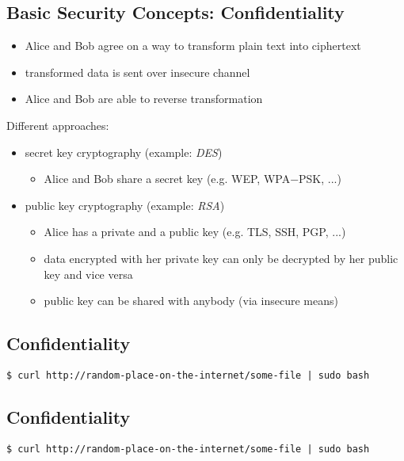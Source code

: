 \documentclass[xga]{xdvislides}
\begin{document}
\subsection{Basic Security Concepts: Confidentiality}
\begin{itemize}
	\item Alice and Bob agree on a way to transform plain text into ciphertext
	\item transformed data is sent over insecure channel
	\item Alice and Bob are able to reverse transformation
\end{itemize}
\addvspace{.5in}
Different approaches:
\begin{itemize}
	\item secret key cryptography (example: {\em DES})
		\begin{itemize}
			\item Alice and Bob share a secret key (e.g. WEP, WPA−PSK, ...)
		\end{itemize}
\end{itemize}
\addvspace{.25in}
\begin{itemize}
	\item public key cryptography (example: {\em RSA})
		\begin{itemize}
			\item Alice has a private and a public key (e.g. TLS, SSH, PGP, ...)
			\item data encrypted with her private key can only be decrypted by
				her public key and vice versa
			\item public key can be shared with anybody (via insecure means)
		\end{itemize}
\end{itemize}

\subsection{Confidentiality}
\begin{verbatim}
$ curl http://random-place-on-the-internet/some-file | sudo bash
\end{verbatim}

\subsection{Confidentiality}
\begin{verbatim}
$ curl http://random-place-on-the-internet/some-file | sudo bash
\end{verbatim}
\end{document}
